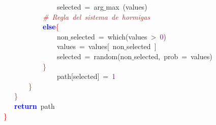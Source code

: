 \mbox{}\ \ \ \ \ \ \ \ \ \ \ \ \ \ \ \ selected\ \textcolor{BrickRed}{=}\ arg$\_$max\ \textcolor{BrickRed}{(}values\textcolor{BrickRed}{)} \\
\mbox{}\ \ \ \ \ \ \ \ \ \ \ \ \textit{\textcolor{Brown}{\#\ Regla\ del\ sistema\ de\ hormigas}} \\
\mbox{}\ \ \ \ \ \ \ \ \ \ \ \ \textbf{\textcolor{Blue}{else}}\textcolor{Red}{\{} \\
\mbox{}\ \ \ \ \ \ \ \ \ \ \ \ \ \ \ \ non$\_$selected\ \textcolor{BrickRed}{=}\ which\textcolor{BrickRed}{(}values\ \textcolor{BrickRed}{\textgreater{}}\ \textcolor{Purple}{0}\textcolor{BrickRed}{)} \\
\mbox{}\ \ \ \ \ \ \ \ \ \ \ \ \ \ \ \ values\ \textcolor{BrickRed}{=}\ values\textcolor{BrickRed}{[}\ non$\_$selected\ \textcolor{BrickRed}{]} \\
\mbox{}\ \ \ \ \ \ \ \ \ \ \ \ \ \ \ \ selected\ \textcolor{BrickRed}{=}\ random\textcolor{BrickRed}{(}non$\_$selected\textcolor{BrickRed}{,}\ prob\ \textcolor{BrickRed}{=}\ values\textcolor{BrickRed}{)} \\
\mbox{}\ \ \ \ \ \ \ \ \ \ \ \ \textcolor{Red}{\}} \\
\mbox{}\ \ \ \ \ \ \ \ \ \ \ \ \ \ \ \ path\textcolor{BrickRed}{[}selected\textcolor{BrickRed}{]}\ \textcolor{BrickRed}{=}\ \textcolor{Purple}{1} \\
\mbox{}\ \ \ \ \ \ \ \ \textcolor{Red}{\}} \\
\mbox{}\ \ \ \ \textcolor{Red}{\}} \\
\mbox{}\ \ \ \ \textbf{\textcolor{Blue}{return}}\ path \\
\mbox{}\ \textcolor{Red}{\}} \\
\mbox{}
